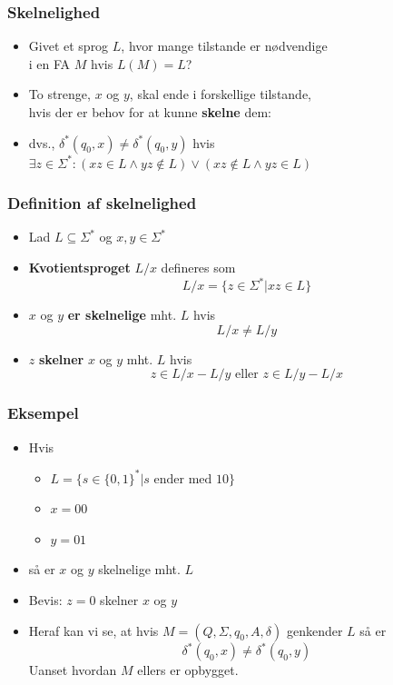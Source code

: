 \documentclass[]{beamer}
\begin{document}
\begin{frame}
  \frametitle{Skelnelighed}
  \begin{itemize}
  \item   Givet et sprog $L$, hvor mange tilstande er
nødvendige \\ i en FA $M$ hvis $L(M)=L$?
\item To strenge, $x$ og $y$, skal ende i forskellige
tilstande,\\ hvis der er behov for at kunne
\textbf{skelne} dem:
\item dvs., $δ^*(q_0, x) ≠ δ^*(q_0, y)$
      hvis $∃z∈ Σ^*: (xz∈L ∧ yz∉L) ∨ 
                  (xz∉L ∧ yz∈L)$

  \end{itemize}
\end{frame}

\begin{frame}
  \frametitle{Definition af skelnelighed}
  \begin{itemize}
  \item Lad $L⊆Σ^*$ og $x,y∈Σ^*$
\item 
\textbf{Kvotientsproget} $L/x$ defineres som
   \[ L/x = \{ z∈ Σ^* | xz∈L \}\]
\item $x$ og $y$ \textbf{er skelnelige} mht. $L$ hvis
\[L/x ≠ L/y\]
\item $z$ \textbf{skelner} $x$ og $y$ mht. $L$ hvis
\[z∈L/x - L/y\text{ eller }z∈L/y - L/x\]

  \end{itemize}
\end{frame}

\begin{frame}
  \frametitle{Eksempel}
  \begin{itemize}
  \item Hvis
\begin{itemize}
\item $L = \{ s∈\{0,1\}^* | s\text{ ender med }10 \}$
\item $x = 00$
\item $y = 01$
\end{itemize}
    \item så er $x$ og $y$ skelnelige mht. $L$
\item Bevis:
   $z = 0$ skelner $x$ og $y$
\item Heraf kan vi se, at hvis $M=(Q, Σ, q_0, A, δ)$ genkender $L$
  så er \[δ^*(q_0, x) ≠ δ^*(q_0, y)\]
Uanset hvordan $M$ ellers er opbygget.
  \end{itemize}
\end{frame}
\end{document}
